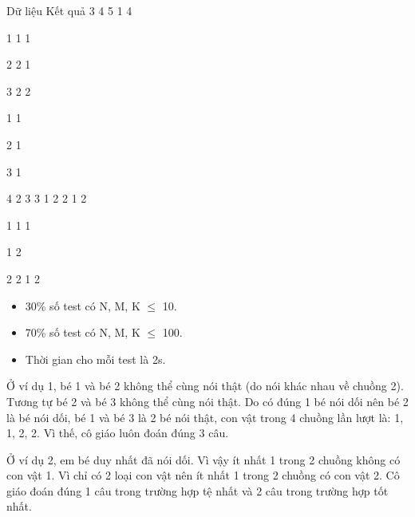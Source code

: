 Dữ liệu                   Kết quả                   3 4 5 1 4         

           1 1 1          

           2 2 1          

           3 2 2          

           1 1          

           2 1          

           3 1          

           4 2                    3 3                   1 2 2 1 2         

           1 1 1          

           1 2          

           2 2                    1 2         
\\
\begin{itemize}
	\item        30\% số test có    N, M, K  $\le$  10.      
	\item        70\% số test có    N, M, K  $\le$  100.      
	\item        Thời gian cho    mỗi test là 2s.      
\end{itemize}
Ở ví dụ 1, bé 1 và bé  2 không thể cùng nói thật (do nói khác nhau về chuồng 2).  Tương tự bé 2 và bé 3 không thể cùng nói thật. Do có  đúng 1 bé nói dối nên bé 2 là bé nói dối, bé 1 và bé  3 là 2 bé nói thật, con vật trong 4 chuồng lần lượt là:  1, 1, 2, 2. Vì thế, cô giáo luôn đoán đúng 3 câu.     

      Ở ví dụ 2, em bé duy  nhất đã nói dối. Vì vậy ít nhất 1 trong 2 chuồng không  có con vật 1. Vì chỉ có 2 loại con vật nên ít nhất 1  trong 2 chuồng có con vật 2. Cô giáo đoán đúng 1 câu trong  trường hợp tệ nhất và 2 câu trong trường hợp tốt nhất.